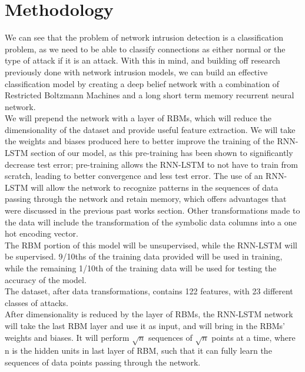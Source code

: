 \documentclass[a4paper]{article}
\begin{document}
\section{Methodology}
\hspace*{10mm}
We can see that the problem of network intrusion detection is a classification problem, as we need to be able to classify connections as either normal or the type of attack if it is an attack. With this in mind, and building off research previously done with network intrusion models, we can build an effective classification model by creating a deep belief network with a combination of Restricted Boltzmann Machines and a long short term memory recurrent neural network. 
\\\hspace*{10mm}
We will prepend the network with a layer of RBMs, which will reduce the dimensionality of the dataset and provide useful feature extraction. We will take the weights and biases produced here to better improve the training of the RNN-LSTM section of our model, as this pre-training has been shown to significantly decrease test error; pre-training allows the RNN-LSTM to not have to train from scratch, leading to better convergence and less test error. The use of an RNN-LSTM will allow the network to recognize patterns in the sequences of data passing through the network and retain memory, which offers advantages that were discussed in the previous past works section. Other transformations made to the data will include the transformation of the symbolic data columns into a one hot encoding vector. 
\\\hspace*{10mm}
The RBM portion of this model will be unsupervised, while the RNN-LSTM will be supervised.
9/10ths of the training data provided will be used in training, while the remaining 1/10th of the training data will be used for testing the accuracy of the model.
\\\hspace*{10mm}
The dataset, after data transformations, contains 122 features, with 23 different classes of attacks.
\\\hspace*{10mm}
After dimensionality is reduced by the layer of RBMs, the RNN-LSTM network will take the last RBM layer and use it as input, and will bring in the RBMs' weights and biases. It will perform $\sqrt{n}$ sequences of $\sqrt{n}$ points at a time, where n is the hidden units in last layer of RBM, such that it can fully learn the sequences of data points passing through the network.
\end{document}
